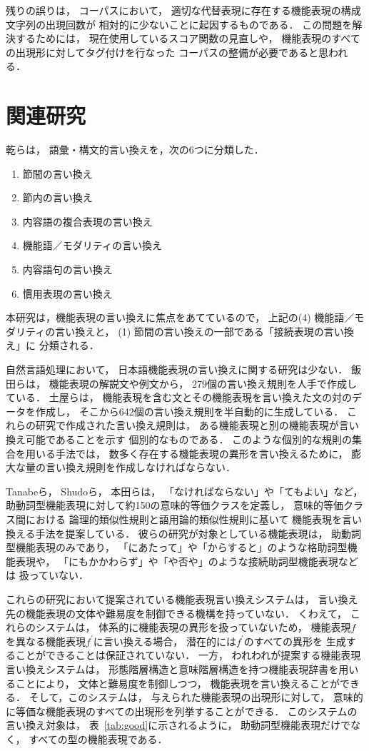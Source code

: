 \documentclass[japanese]{jnlp_1.4}
\begin{document}
残りの誤りは，
コーパスにおいて，
適切な代替表現に存在する機能表現の構成文字列の出現回数が
相対的に少ないことに起因するものである．
この問題を解決するためには，
現在使用しているスコア関数の見直しや，
機能表現のすべての出現形に対してタグ付けを行なった
コーパスの整備が必要であると思われる．



\section{関連研究}

乾らは，
語彙・構文的言い換えを，次の6つに分類した．
\begin{enumerate}
\item 節間の言い換え
\item 節内の言い換え
\item 内容語の複合表現の言い換え
\item 機能語／モダリティの言い換え
\item 内容語句の言い換え
\item 慣用表現の言い換え
\end{enumerate}
本研究は，機能表現の言い換えに焦点をあてているので，
上記の(4) 機能語／モダリティの言い換えと，
(1) 節間の言い換えの一部である「接続表現の言い換え」に
分類される．

自然言語処理において，
日本語機能表現の言い換えに関する研究は少ない．
飯田らは，
機能表現の解説文や例文から，
279個の言い換え規則を人手で作成している．
土屋らは，
機能表現を含む文とその機能表現を言い換えた文の対のデータを作成し，
そこから642個の言い換え規則を半自動的に生成している．
これらの研究で作成された言い換え規則は，
ある機能表現と別の機能表現が言い換え可能であることを示す
個別的なものである．
このような個別的な規則の集合を用いる手法では，
数多く存在する機能表現の異形を言い換えるために，
膨大な量の言い換え規則を作成しなければならない．

Tanabeら，
Shudoら，
本田らは，
「なければならない」や「てもよい」など，
助動詞型機能表現に対して約150の意味的等価クラスを定義し，
意味的等価クラス間における
論理的類似性規則と語用論的類似性規則に基いて
機能表現を言い換える手法を提案している．
彼らの研究が対象としている機能表現は，
助動詞型機能表現のみであり，
「にあたって」や「からすると」のような格助詞型機能表現や，
「にもかかわらず」や「や否や」のような接続助詞型機能表現などは
扱っていない．

これらの研究において提案されている機能表現言い換えシステムは，
言い換え先の機能表現の文体や難易度を制御できる機構を持っていない．
くわえて，
これらのシステムは，
体系的に機能表現の異形を扱っていないため，
機能表現$f$を異なる機能表現$f^\prime$に言い換える場合，
潜在的には$f^\prime$のすべての異形を
生成することができることは保証されていない．
一方，
われわれが提案する機能表現言い換えシステムは，
形態階層構造と意味階層構造を持つ機能表現辞書を用いることにより，
文体と難易度を制御しつつ，
機能表現を言い換えることができる．
そして，このシステムは，
与えられた機能表現の出現形に対して，
意味的に等価な機能表現のすべての出現形を列挙することができる．
このシステムの言い換え対象は，
表~\ref{tab:good}に示されるように，
助動詞型機能表現だけでなく，
すべての型の機能表現である．
\end{document}
